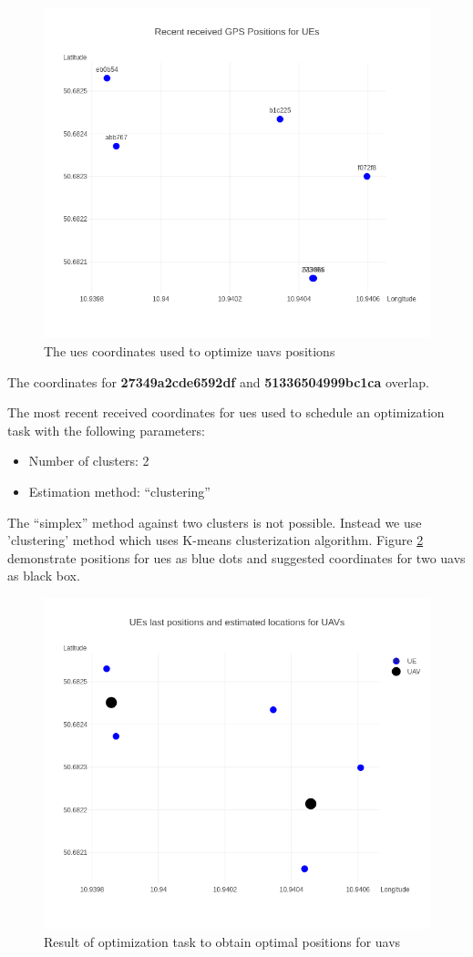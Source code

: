 \begin{figure}[H]
	\centering
	\includegraphics[width=0.5\linewidth,keepaspectratio]{images/Exp4_UEs_Location_to_optimize.png}
\caption{The \glspl{ue} coordinates used to optimize \glspl{uav} positions}
\label{fig:ues-positions-for-optimization}
\end{figure}

The coordinates for \textbf{27349a2cde6592df} and
\textbf{51336504999bc1ca} overlap.

The most recent received coordinates for \glspl{ue} used to schedule an optimization task with the following parameters:

\begin{itemize}
\tightlist
\item
  Number of clusters: 2
\item
  Estimation method: ``clustering''
\end{itemize}

The ``simplex'' method against two clusters is not possible. Instead we use 'clustering' method which uses K-means clusterization algorithm. Figure \ref{fig:ues-positions-and-suggested-optimal-positions-for-uavs} demonstrate positions for \glspl{ue} as blue dots and suggested coordinates for two \glspl{uav} as black box.

\begin{figure}[H]
	\centering
	\includegraphics[width=0.5\linewidth,keepaspectratio]{images/Expt4_Estimated UAVs_locations.png}
\caption{Result of optimization task to obtain optimal positions for \glspl{uav}}
\label{fig:ues-positions-and-suggested-optimal-positions-for-uavs}
\end{figure}

